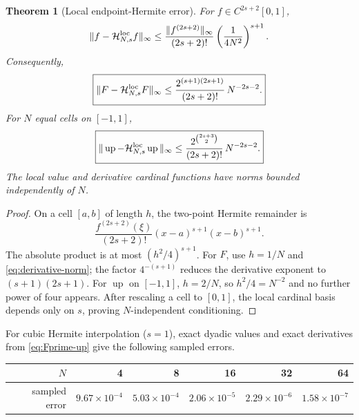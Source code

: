 \documentclass[11pt,oneside]{article}
\newtheorem{theorem}{Theorem}[section]
\theoremstyle{definition}
\theoremstyle{remark}
\newcommand{\Up}{\operatorname{up}}
\begin{document}
\begin{theorem}[Local endpoint-Hermite error]
\label{thm:local-error}
For $f\in C^{2s+2}[0,1]$,
\begin{equation}
 \|f-\mathcal H^{\rm loc}_{N,s}f\|_\infty
 \le \frac{\|f^{(2s+2)}\|_\infty}{(2s+2)!}
 \left(\frac{1}{4N^2}\right)^{s+1}.
 \label{eq:local-general}
\end{equation}
Consequently,
\begin{equation}
 \boxed{
 \|F-\mathcal H^{\rm loc}_{N,s}F\|_\infty
 \le
 \frac{2^{(s+1)(2s+1)}}{(2s+2)!}\,N^{-2s-2}.}
 \label{eq:local-F-bound}
\end{equation}
For $N$ equal cells on $[-1,1]$,
\begin{equation}
 \boxed{
 \|\Up-\mathcal H^{\rm loc}_{N,s}\Up\|_\infty
 \le
 \frac{2^{\binom{2s+3}{2}}}{(2s+2)!}\,N^{-2s-2}.}
 \label{eq:local-up-bound}
\end{equation}
The local value and derivative cardinal functions have norms bounded independently of $N$.
\end{theorem}

\begin{proof}
On a cell $[a,b]$ of length $h$, the two-point Hermite remainder is
\[
 \frac{f^{(2s+2)}(\xi)}{(2s+2)!}(x-a)^{s+1}(x-b)^{s+1}.
\]
The absolute product is at most $(h^2/4)^{s+1}$.  For $F$, use $h=1/N$ and
\eqref{eq:derivative-norm}; the factor $4^{-(s+1)}$ reduces the derivative exponent to
$(s+1)(2s+1)$.  For $\Up$ on $[-1,1]$, $h=2/N$, so $h^2/4=N^{-2}$ and no further power of
four appears.  After rescaling a cell to $[0,1]$, the local cardinal basis depends only on
$s$, proving $N$-independent conditioning.
\end{proof}

For cubic Hermite interpolation ($s=1$), exact dyadic values and exact derivatives from
\eqref{eq:Fprime-up} give the following sampled errors.

\begin{center}
\small
\begin{tabular}{@{}rrrrrr@{}}
\toprule
$N$ & 4 & 8 & 16 & 32 & 64\\
\midrule
sampled error & $9.67\times10^{-4}$ & $5.03\times10^{-4}$ & $2.06\times10^{-5}$ & $2.29\times10^{-6}$ & $1.58\times10^{-7}$\\
\bottomrule
\end{tabular}
\label{tab:local-errors}
\end{center}
\end{document}
